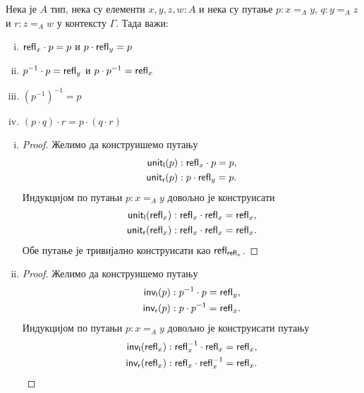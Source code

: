 \documentclass[12pt,oneside]{memoir}
\begin{document}
\begin{lemma}
    Нека је $A$ тип, нека су елементи $x, y, z, w : A$ и нека су путање $p : x =_A y,\, q : y =_A z$ и $r : z =_A w$ у контексту $\Gamma$. Тада важи:
    \begin{enumerate}[(i)]
        \item $\mathsf{refl}_{x} \cdot p = p$ и $p \cdot \mathsf{refl}_{y} = p$
        \item $p^{-1} \cdot p = \mathsf{refl}_{y}$ и $p \cdot p^{-1} = \mathsf{refl}_{x}$
        \item $(p^{-1})^{-1} = p$
        \item $(p \cdot q) \cdot r = p \cdot (q \cdot r)$
    \end{enumerate}
\end{lemma}
\begin{enumerate}[(i)]
    \item 
    \begin{proof}
        Желимо да конструишемо путању
        \begin{align*}
            \mathsf{unit_l}(p) &: \mathsf{refl}_{x} \cdot p = p, \\
            \mathsf{unit_r}(p) &: p \cdot \mathsf{refl}_{y} = p. \\
        \end{align*} 
        Индукцијом по путањи $p : x =_A y$ довољно је конструисати
        \begin{align*}
            \mathsf{unit_l}(\mathsf{refl}_{x}) &: \mathsf{refl}_{x} \cdot \mathsf{refl}_{x} = \mathsf{refl}_{x}, \\
            \mathsf{unit_r}(\mathsf{refl}_{x}) &: \mathsf{refl}_{x} \cdot \mathsf{refl}_{x} = \mathsf{refl}_{x}.
        \end{align*} 
        Обе путање је тривијално конструисати као $\mathsf{refl}_{\mathsf{refl}_{x}}$.
    \end{proof}
    \item 
    \begin{proof}
        Желимо да конструишемо путању
        \begin{align*}
            \mathsf{inv_l}(p) &: p^{-1} \cdot p = \mathsf{refl}_{y}, \\
            \mathsf{inv_r}(p) &: p \cdot p^{-1} = \mathsf{refl}_{x}.
        \end{align*}
        Индукцијом по путањи $p : x =_A y$ довољно је конструисати путању
        \begin{align*}
            \mathsf{inv_l}(\mathsf{refl}_{x}) &: \mathsf{refl}_{x}^{-1} \cdot \mathsf{refl}_{x} = \mathsf{refl}_{x}, \\
            \mathsf{inv_r}(\mathsf{refl}_{x}) &: \mathsf{refl}_{x} \cdot \mathsf{refl}_{x}^{-1} = \mathsf{refl}_{x}.
        \end{align*}

\end{proof}
\end{enumerate}
\end{document}
